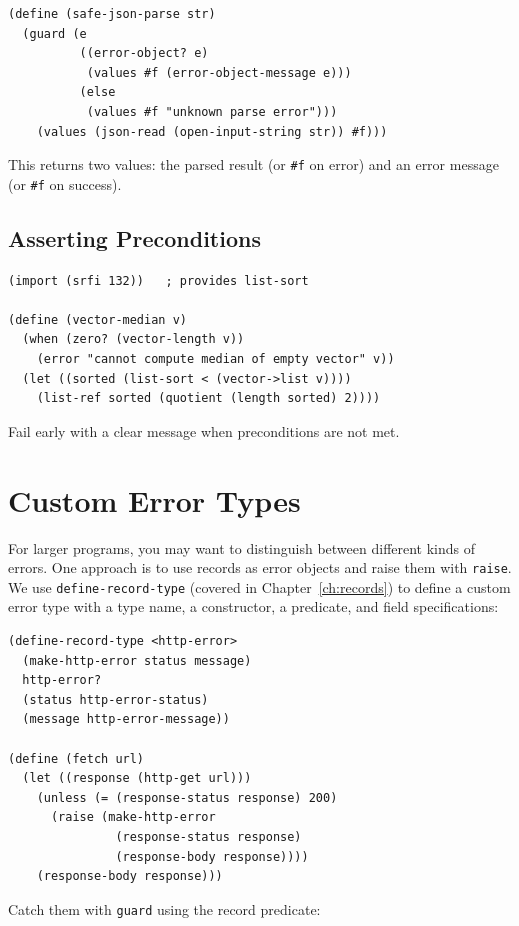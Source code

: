 \begin{lstlisting}
(define (safe-json-parse str)
  (guard (e
          ((error-object? e)
           (values #f (error-object-message e)))
          (else
           (values #f "unknown parse error")))
    (values (json-read (open-input-string str)) #f)))
\end{lstlisting}

This returns two values: the parsed result (or \texttt{\#f} on error) and an error message (or \texttt{\#f} on success).

\subsection{Asserting Preconditions}

\begin{lstlisting}
(import (srfi 132))   ; provides list-sort

(define (vector-median v)
  (when (zero? (vector-length v))
    (error "cannot compute median of empty vector" v))
  (let ((sorted (list-sort < (vector->list v))))
    (list-ref sorted (quotient (length sorted) 2))))
\end{lstlisting}

Fail early with a clear message when preconditions are not met.

\section{Custom Error Types}

For larger programs, you may want to distinguish between different kinds of errors. One approach is to use records as error objects and raise them with \texttt{raise}. We use \texttt{define-record-type} (covered in Chapter~\ref{ch:records}) to define a custom error type with a type name, a constructor, a predicate, and field specifications:

\begin{lstlisting}
(define-record-type <http-error>
  (make-http-error status message)
  http-error?
  (status http-error-status)
  (message http-error-message))

(define (fetch url)
  (let ((response (http-get url)))
    (unless (= (response-status response) 200)
      (raise (make-http-error
               (response-status response)
               (response-body response))))
    (response-body response)))
\end{lstlisting}

Catch them with \texttt{guard} using the record predicate:


